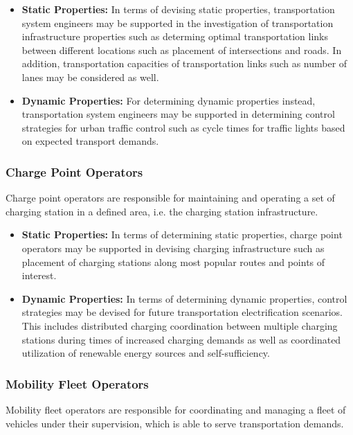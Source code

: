 \documentclass[a4paper,twoside]{article}
\begin{document}
\begin{itemize}
	\item \textbf{Static Properties:} In terms of devising static properties, transportation system engineers may be supported in the investigation of transportation infrastructure properties such as determing optimal transportation links between different locations such as placement of intersections and roads. In addition, transportation capacities of transportation links such as number of lanes may be considered as well.
	\item \textbf{Dynamic Properties:} For determining dynamic properties instead, transportation system engineers may be supported in determining control strategies for urban traffic control such as cycle times for traffic lights based on expected transport demands. 
\end{itemize}
	
\subsubsection{Charge Point Operators}
Charge point operators are responsible for maintaining and operating a set of charging station in a defined area, i.e. the charging station infrastructure. 

\begin{itemize}
	\item \textbf{Static Properties:} In terms of determining static properties, charge point operators may be supported in devising charging infrastructure such as placement of charging stations along most popular routes and points of interest. 
	\item \textbf{Dynamic Properties:} In terms of determining dynamic properties, control strategies may be devised for future transportation electrification scenarios. This includes distributed charging coordination between multiple charging stations during times of increased charging demands as well as coordinated utilization of renewable energy sources and self-sufficiency.
\end{itemize}

\subsubsection{Mobility Fleet Operators}
Mobility fleet operators are responsible for coordinating and managing a fleet of vehicles under their supervision, which is able to serve transportation demands. 
\end{document}
